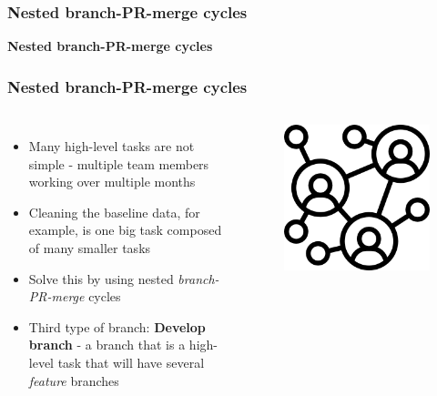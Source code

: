 \documentclass[aspectratio=169]{beamer} %
\begin{document}
\begin{frame}
	\frametitle{Nested branch-PR-merge cycles}

	\huge\centering \textbf{Nested branch-PR-merge cycles}

\end{frame}

\begin{frame}
	\frametitle{Nested branch-PR-merge cycles}
	\begin{columns}[c]

		\begin{itemize}
			\setlength\itemsep{.5em}
			\item Many high-level tasks are not simple
			- multiple team members working over multiple months
			\item Cleaning the baseline data,
			for example, is one big task composed of many smaller tasks
			\item Solve this by using nested \textit{branch-PR-merge} cycles
			\item Third type of branch: \textbf{Develop branch}
			- a branch that is a high-level task that
			will have several \textit{feature} branches
		\end{itemize}


		\begin{figure}
			\centering
			\includegraphics[width=.65\textwidth]{./img/team-challenge.png}
		\end{figure}
	\end{columns}
\end{frame}
\end{document}
